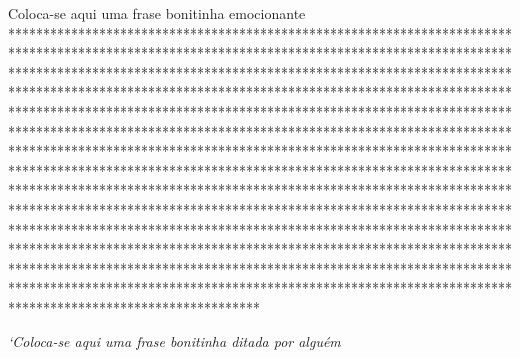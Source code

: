 \begin{agradecimentos}
Coloca-se aqui uma frase bonitinha emocionante
************************************************************************************************************************************************************************************************************************************************************************************************************************************************************************************************************************************************************************************************************************************************************************************************************************************************************************************************************************************************************************************************************************************************************************************************************************************************************************************************************************************************************************************

\end{agradecimentos}

\begin{epigrafe}
    \vspace*{\fill}
	\begin{flushright}
		\textit{`Coloca-se aqui uma frase bonitinha ditada por alguém}
	\end{flushright}
\end{epigrafe}
